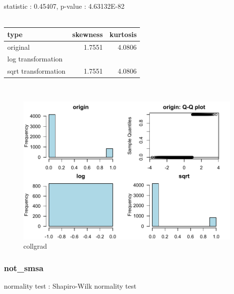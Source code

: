 \documentclass{book}\usepackage[]{graphicx}\usepackage[]{color}
\begin{document}
\noindent statistic : 0.45407,  p-value : 4.63132E-82\\
\\%
\begin{tabular}{lrr}
  \toprule
type & skewness & kurtosis \\ 
  \midrule
original & 1.7551 & 4.0806 \\ 
  log transformation &  &  \\ 
  sqrt transformation & 1.7551 & 4.0806 \\ 
   \bottomrule
\end{tabular}
\\
\begin{figure}[!ht]
\centering
\includegraphics[width=1.0\textwidth]{figure/norm9.pdf}
\caption{collgrad}
\end{figure}
\clearpage
\subsubsection{ not\_smsa }

normality test : Shapiro-Wilk normality test
\end{document}
